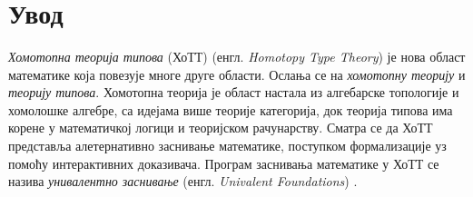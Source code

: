 \documentclass[12pt,oneside]{memoir}
\begin{document}
\frontmatter\

\naslovna\

\komisija\


\apstrakt\

\tableofcontents*

\mainmatter\

\chapter{Увод}






\emph{Хомотопна теорија типова} (ХоТТ) (енгл. \emph{Homotopy Type Theory}) је нова област математике која повезује многе друге области. Ослања се на \emph{хомотопну теорију} и \emph{теорију типова}. Хомотопна теорија је област настала из алгебарске топологије и хомолошке алгебре, са идејама више теорије категорија, док теорија типова има корене у математичкој логици и теоријском рачунарству. Сматра се да ХоТТ представља алетернативно заснивање математике, поступком формализације уз помоћу интерактивних доказивача. Програм заснивања математике у ХоТТ се назива \emph{унивалентно заснивање} (енгл. \emph{Univalent Foundations}) \cite{hottbook}. 
\end{document}

